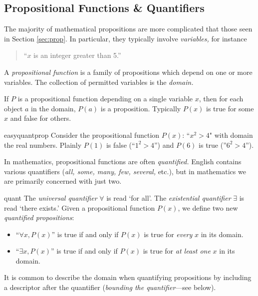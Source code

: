 \clearpage



\subsection{Propositional Functions \& Quantifiers}\label{sec:quant}

The majority of mathematical propositions are more complicated that those seen in Section \ref{sec:prop}. In particular, they typically involve \emph{variables,} for instance
\begin{quote}
	``$x$ is an integer greater than 5.''
\end{quote}

\begin{defn}{}{}
	A \emph{propositional function} is a family of propositions which depend on one or more variables. The collection of permitted variables is the \emph{domain.}
\end{defn}

If $P$ is a propositional function depending on a single variable $x$, then for each object $a$ in the domain, $P(a)$ is a proposition. Typically $P(x)$ is true for some $x$ and false for others.

\begin{example}{}{easyquantprop}
	Consider the propositional function $P(x)$: ``$x^2>4$" with domain the real numbers. Plainly $P(1)$ is false (``$1^2>4$'') and $P(6)$ is true (''$6^2>4$'').
\end{example}


In mathematics, propositional functions are often \emph{quantified.} English contains various quantifiers (\emph{all, some, many, few, several,} etc.), but in mathematics we are primarily concerned with just two.


\begin{defn}{}{quant}
	The \emph{universal quantifier} $\forall$ is read `for all'. The \emph{existential quantifier} $\exists$ is read `there exists.' Given a propositional function $P(x)$, we define two new \emph{quantified propositions}:
	\begin{itemize}
	  \item ``$\forall x, P(x)$'' is true if and only if $P(x)$ is true for \emph{every} $x$ in its domain.
	  \item ``$\exists x, P(x)$'' is true if and only if $P(x)$ is true for \emph{at least one} $x$ in its domain.
	\end{itemize}
	It is common to describe the domain when quantifying propositions by including a descriptor after the quantifier (\emph{bounding the quantifier}---see below).
\end{defn}

